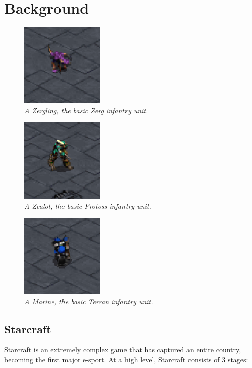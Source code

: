 \documentclass[twocolumn]{article}
\begin{document}
\section{Background}
\begin{figure}
	\begin{center}
		\includegraphics[width=4cm]{zergling.png}
	\end{center}
	\caption{\textit{A Zergling, the basic Zerg infantry unit. }}
	\label{fig:zergling}
\end{figure}
\begin{figure}
	\begin{center}
		\includegraphics[width=4cm]{zealot.png}
	\end{center}
	\caption{\textit{A Zealot, the basic Protoss infantry unit.}}
	\label{fig:zealot}
\end{figure}
\begin{figure}
	\begin{center}
		\includegraphics[width=4cm]{marine.png}
	\end{center}
	\caption{\textit{A Marine, the basic Terran infantry unit.}}
	\label{fig:marine}
\end{figure}
\subsection{Starcraft}
Starcraft is an extremely complex game that has captured an entire country, becoming the first major e-sport. At a high level, Starcraft consists of 3 stages:
\end{document}
